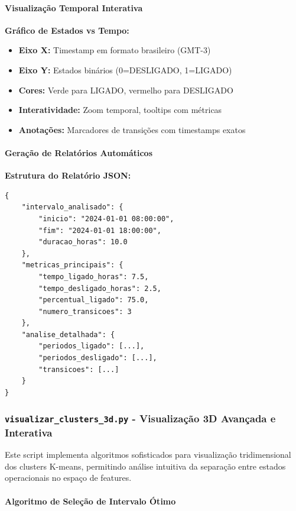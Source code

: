 \paragraph{Visualização Temporal Interativa}

\textbf{Gráfico de Estados vs Tempo:}

\begin{itemize}
    \item \textbf{Eixo X:} Timestamp em formato brasileiro (GMT-3)
    \item \textbf{Eixo Y:} Estados binários (0=DESLIGADO, 1=LIGADO)
    \item \textbf{Cores:} Verde para LIGADO, vermelho para DESLIGADO
    \item \textbf{Interatividade:} Zoom temporal, tooltips com métricas
    \item \textbf{Anotações:} Marcadores de transições com timestamps exatos
\end{itemize}

\paragraph{Geração de Relatórios Automáticos}

\textbf{Estrutura do Relatório JSON:}
\begin{verbatim}
{
    "intervalo_analisado": {
        "inicio": "2024-01-01 08:00:00",
        "fim": "2024-01-01 18:00:00",
        "duracao_horas": 10.0
    },
    "metricas_principais": {
        "tempo_ligado_horas": 7.5,
        "tempo_desligado_horas": 2.5,
        "percentual_ligado": 75.0,
        "numero_transicoes": 3
    },
    "analise_detalhada": {
        "periodos_ligado": [...],
        "periodos_desligado": [...],
        "transicoes": [...]
    }
}
\end{verbatim}

\subsubsection{\texttt{visualizar\_clusters\_3d.py} - Visualização 3D Avançada e Interativa}

Este script implementa algoritmos sofisticados para visualização tridimensional dos clusters K-means, permitindo análise intuitiva da separação entre estados operacionais no espaço de features.

\paragraph{Algoritmo de Seleção de Intervalo Ótimo}

